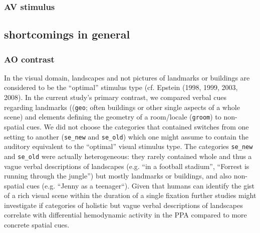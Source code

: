 \documentclass[english]{article}
\begin{document}


\subsubsection{AV stimulus}


\subsection{shortcomings in general}

\subsubsection{AO contrast}

In the visual domain, landscapes and not pictures of landmarks or buildings are
considered to be the ``optimal'' stimulus type (cf. Epstein (1998, 1999, 2003,
2008).
In the current study's primary contrast, we compared verbal cues regarding
landmarks ((\texttt{geo}; often buildings or other single aspects of a whole
scene) and elements defining the geometry of a room/locale (\texttt{groom}) to
non-spatial cues.
We did not choose the categories that contained switches from one setting to
another (\texttt{se\_new} and \texttt{se\_old}) which one might assume to
contain the auditory equivalent to the ``optimal'' visual stimulus type.
The categories \texttt{se\_new} and \texttt{se\_old} were actually
heterogeneous: they rarely contained whole and thus a vague verbal descriptions
of landscapes (e.g. ``in a football stadium'', ``Forrest is running through the
jungle'') but mostly landmarks or buildings, and also non-spatial
cues (e.g. ``Jenny as a teenager``).
Given that humans can identify the gist of a rich visual scene within the
duration of a single fixation \citep{henderson2003human} further studies might
investigate if categories of holistic but vague verbal descriptions of
landscapes correlate with differential hemodynamic activity in the PPA compared
to more concrete spatial cues.
\end{document}
